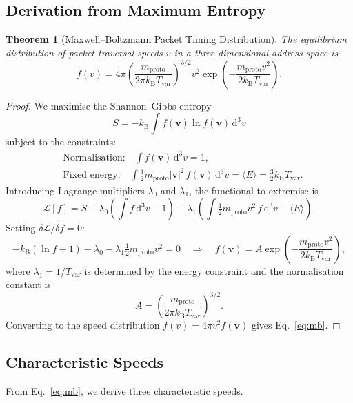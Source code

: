 \documentclass[11pt,twocolumn,a4paper]{article}
\newtheorem{theorem}{Theorem}[section]
\theoremstyle{definition}
\theoremstyle{remark}
\newcommand{\kB}{k_{\mathrm{B}}}
\newcommand{\Tvar}{T_{\mathrm{var}}}
\newcommand{\mpr}{m_{\mathrm{proto}}}
\newcommand{\dd}{\mathrm{d}}
\newcommand{\avg}[1]{\langle #1 \rangle}
\begin{document}
\subsection{Derivation from Maximum Entropy}\label{sec:maxent}

\begin{theorem}[Maxwell--Boltzmann Packet Timing Distribution]\label{thm:mb}
The equilibrium distribution of packet traversal speeds $v$ in a
three-dimensional address space is
\begin{equation}\label{eq:mb}
  f(v) = 4\pi\left(\frac{\mpr}{2\pi\kB\Tvar}\right)^{3/2}
  v^2\exp\!\left(-\frac{\mpr v^2}{2\kB\Tvar}\right).
\end{equation}
\end{theorem}

\begin{proof}
We maximise the Shannon--Gibbs entropy~\cite{Shannon1948,Jaynes1957}
\begin{equation}\label{eq:shannon}
  S = -\kB\int f(\bm{v})\ln f(\bm{v})\,\dd^3 v
\end{equation}
subject to the constraints:
\begin{align}
  &\text{Normalisation:}\quad \int f(\bm{v})\,\dd^3 v = 1,
  \label{eq:norm_constraint}\\
  &\text{Fixed energy:}\quad \int\frac{1}{2}\mpr|\bm{v}|^2\,
  f(\bm{v})\,\dd^3 v = \avg{E} = \frac{3}{2}\kB\Tvar.
  \label{eq:energy_constraint}
\end{align}
Introducing Lagrange multipliers $\lambda_0$ and $\lambda_1$, the functional
to extremise is
\[
  \mathcal{L}[f] = S - \lambda_0\!\left(\int f\,\dd^3 v-1\right)
  -\lambda_1\!\left(\int\tfrac{1}{2}\mpr v^2\,f\,\dd^3 v-\avg{E}\right).
\]
Setting $\delta\mathcal{L}/\delta f=0$:
\[
  -\kB(\ln f+1)-\lambda_0-\lambda_1\tfrac{1}{2}\mpr v^2 = 0
  \quad\Longrightarrow\quad
  f(\bm{v}) = A\exp\!\left(-\frac{\mpr v^2}{2\kB\Tvar}\right),
\]
where $\lambda_1=1/\Tvar$ is determined by the energy constraint and the
normalisation constant is
\[
  A = \left(\frac{\mpr}{2\pi\kB\Tvar}\right)^{3/2}.
\]
Converting to the speed distribution
$f(v)=4\pi v^2 f(\bm{v})$ gives Eq.~\eqref{eq:mb}.
\end{proof}

\subsection{Characteristic Speeds}\label{sec:speeds}

From Eq.~\eqref{eq:mb}, we derive three characteristic speeds.
\end{document}
